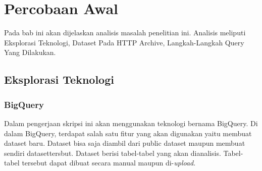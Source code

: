 \chapter{Percobaan Awal}
\label{chap:percobaan_awal}
Pada bab ini akan dijelaskan analisis masalah penelitian ini. Analisis meliputi Eksplorasi Teknologi, Dataset Pada HTTP Archive, Langkah-Langkah Query Yang Dilakukan.

\section{Eksplorasi Teknologi}
\subsection{BigQuery}
Dalam pengerjaan skripsi ini akan menggunakan teknologi bernama BigQuery. Di dalam BigQuery, terdapat salah satu fitur yang akan digunakan yaitu membuat dataset baru. Dataset bisa saja diambil dari public dataset maupun membuat sendiri datasettersbut. Dataset berisi tabel-tabel yang akan dianalisis. Tabel-tabel tersebut dapat dibuat secara manual maupun di-\textit{upload}.

